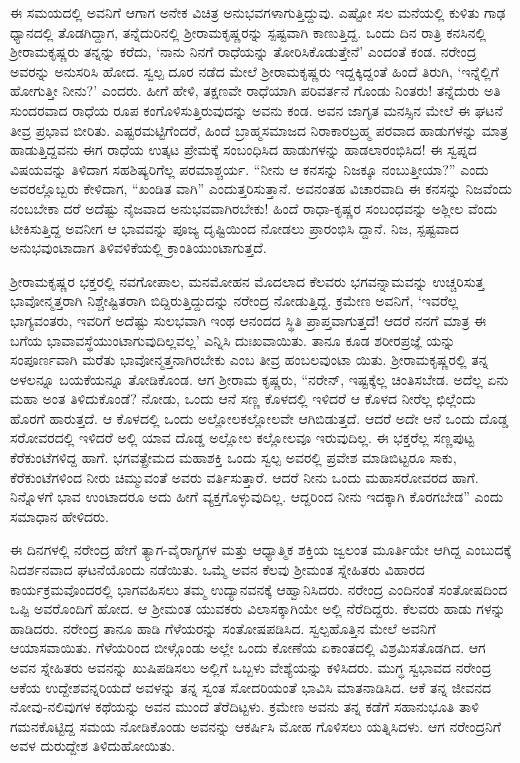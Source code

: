 ಈ ಸಮಯದಲ್ಲಿ ಅವನಿಗೆ ಆಗಾಗ ಅನೇಕ ವಿಚಿತ್ರ ಅನುಭವಗಳಾಗುತ್ತಿದ್ದುವು. ಎಷ್ಟೋ ಸಲ ಮನೆಯಲ್ಲಿ ಕುಳಿತು ಗಾಢ ಧ್ಯಾನದಲ್ಲಿ ತೊಡಗಿದ್ದಾಗ, ತನ್ನೆದುರಿನಲ್ಲಿ ಶ್ರೀರಾಮಕೃಷ್ಣರನ್ನು ಸ್ಪಷ್ಟವಾಗಿ ಕಾಣುತ್ತಿದ್ದ. ಒಂದು ದಿನ ರಾತ್ರಿ ಕನಸಿನಲ್ಲಿ ಶ್ರೀರಾಮಕೃಷ್ಣರು ತನ್ನನ್ನು ಕರೆದು, ‘ನಾನು ನಿನಗೆ ರಾಧೆಯನ್ನು ತೋರಿಸಿಕೊಡುತ್ತೇನೆ’ ಎಂದಂತೆ ಕಂಡ. ನರೇಂದ್ರ ಅವರನ್ನು ಅನುಸರಿಸಿ ಹೋದ. ಸ್ವಲ್ಪ ದೂರ ನಡೆದ ಮೇಲೆ ಶ್ರೀರಾಮಕೃಷ್ಣರು ಇದ್ದಕ್ಕಿದ್ದಂತೆ ಹಿಂದೆ ತಿರುಗಿ, ‘ಇನ್ನೆಲ್ಲಿಗೆ ಹೋಗುತ್ತೀ ನೀನು?’ ಎಂದರು. ಹೀಗೆ ಹೇಳಿ, ತಕ್ಷಣವೇ ರಾಧೆಯಾಗಿ ಪರಿವರ್ತನೆ ಗೊಂಡು ನಿಂತರು! ತನ್ನೆದುರು ಅತಿ ಸುಂದರವಾದ ರಾಧೆಯ ರೂಪ ಕಂಗೊಳಿಸುತ್ತಿರುವುದನ್ನು ಅವನು ಕಂಡ. ಅವನ ಜಾಗೃತ ಮನಸ್ಸಿನ ಮೇಲೆ ಈ ಘಟನೆ ತೀವ್ರ ಪ್ರಭಾವ ಬೀರಿತು. ಎಷ್ಟರಮಟ್ಟಿಗೆಂದರೆ, ಹಿಂದೆ ಬ್ರಾಹ್ಮಸಮಾಜದ ನಿರಾಕಾರಬ್ರಹ್ಮ ಪರವಾದ ಹಾಡುಗಳನ್ನು ಮಾತ್ರ ಹಾಡುತ್ತಿದ್ದವನು ಈಗ ರಾಧೆಯ ಉತ್ಕಟ ಪ್ರೇಮಕ್ಕೆ ಸಂಬಂಧಿಸಿದ ಹಾಡುಗಳನ್ನು ಹಾಡಲಾರಂಭಿಸಿದ! ಈ ಸ್ವಪ್ನದ ವಿಷಯವನ್ನು ತಿಳಿದಾಗ ಸಹಶಿಷ್ಯರಿಗೆಲ್ಲ ಪರಮಾಶ್ಚರ್ಯ. “ನೀನು ಆ ಕನಸನ್ನು ನಿಜಕ್ಕೂ ನಂಬುತ್ತೀಯಾ?” ಎಂದು ಅವರಲ್ಲೊಬ್ಬರು ಕೇಳಿದಾಗ, “ಖಂಡಿತ ವಾಗಿ” ಎಂದುತ್ತರಿಸುತ್ತಾನೆ. ಅವನಂತಹ ವಿಚಾರವಾದಿ ಈ ಕನಸನ್ನು ನಿಜವೆಂದು ನಂಬಬೇಕಾ ದರೆ ಅದೆಷ್ಟು ನೈಜವಾದ ಅನುಭವವಾಗಿರಬೇಕು! ಹಿಂದೆ ರಾಧಾ-ಕೃಷ್ಣರ ಸಂಬಂಧವನ್ನು ಅಶ್ಲೀಲ ವೆಂದು ಟೀಕಿಸುತ್ತಿದ್ದ ಅವನೀಗ ಆ ಭಾವವನ್ನು ಪೂಜ್ಯ ದೃಷ್ಟಿಯಿಂದ ನೋಡಲು ಪ್ರಾರಂಭಿಸಿ ದ್ದಾನೆ. ನಿಜ, ಸ್ಪಷ್ಟವಾದ ಅನುಭವುಂಟಾದಾಗ ತಿಳಿವಳಿಕೆಯಲ್ಲಿ ಕ್ರಾಂತಿಯುಂಟಾಗುತ್ತದೆ.

ಶ್ರೀರಾಮಕೃಷ್ಣರ ಭಕ್ತರಲ್ಲಿ ನವಗೋಪಾಲ, ಮನಮೋಹನ ಮೊದಲಾದ ಕೆಲವರು ಭಗವನ್ನಾಮವನ್ನು ಉಚ್ಚರಿಸುತ್ತ ಭಾವೋನ್ಮತ್ತರಾಗಿ ನಿಶ್ಚೇಷ್ಟಿತರಾಗಿ ಬಿದ್ದಿರುತ್ತಿದ್ದುದನ್ನು ನರೇಂದ್ರ ನೋಡುತ್ತಿದ್ದ. ಕ್ರಮೇಣ ಅವನಿಗೆ, ‘ಇವರೆಲ್ಲ ಭಾಗ್ಯವಂತರು, ಇವರಿಗೆ ಅದೆಷ್ಟು ಸುಲಭವಾಗಿ ಇಂಥ ಆನಂದದ ಸ್ಥಿತಿ ಪ್ರಾಪ್ತವಾಗುತ್ತದೆ! ಆದರೆ ನನಗೆ ಮಾತ್ರ ಈ ಬಗೆಯ ಭಾವಾವಸ್ಥೆಯುಂಟಾಗುವುದಿಲ್ಲವಲ್ಲ’ ಎನ್ನಿಸಿ ದುಃಖವಾಯಿತು. ತಾನೂ ಕೂಡ ಶರೀರಪ್ರಜ್ಞೆ ಯನ್ನು ಸಂಪೂರ್ಣವಾಗಿ ಮರೆತು ಭಾವೋನ್ಮತ್ತನಾಗಿರಬೇಕು ಎಂಬ ತೀವ್ರ ಹಂಬಲವುಂಟಾ ಯಿತು. ಶ್ರೀರಾಮಕೃಷ್ಣರಲ್ಲಿ ತನ್ನ ಅಳಲನ್ನೂ ಬಯಕೆಯನ್ನೂ ತೋಡಿಕೊಂಡ. ಆಗ ಶ್ರೀರಾಮ ಕೃಷ್ಣರು, “ನರೇನ್, ಇಷ್ಟಕ್ಕೆಲ್ಲ ಚಿಂತಿಸಬೇಡ. ಅದೆಲ್ಲ ಏನು ಮಹಾ ಅಂತ ತಿಳಿದುಕೊಂಡೆ? ನೋಡು, ಒಂದು ಆನೆ ಸಣ್ಣ ಕೊಳದಲ್ಲಿ ಇಳಿದರೆ ಆ ಕೊಳದ ನೀರೆಲ್ಲ ಛಿಲ್ಲೆಂದು ಹೊರಗೆ ಹಾರುತ್ತದೆ. ಆ ಕೊಳದಲ್ಲಿ ಒಂದು ಅಲ್ಲೋಲಕಲ್ಲೋಲವೇ ಆಗಿಬಿಡುತ್ತದೆ. ಆದರೆ ಅದೇ ಆನೆ ಒಂದು ದೊಡ್ಡ ಸರೋವರದಲ್ಲಿ ಇಳಿದರೆ ಅಲ್ಲಿ ಯಾವ ದೊಡ್ಡ ಅಲ್ಲೋಲ ಕಲ್ಲೋಲವೂ ಇರುವುದಿಲ್ಲ. ಈ ಭಕ್ತರೆಲ್ಲ ಸಣ್ಣಪುಟ್ಟ ಕೆರೆಕುಂಟೆಗಳಿದ್ದ ಹಾಗೆ. ಭಗವತ್ಪ್ರೇಮದ ಮಹಾಶಕ್ತಿ ಒಂದು ಸ್ವಲ್ಪ ಅವರಲ್ಲಿ ಪ್ರವೇಶ ಮಾಡಿಬಿಟ್ಟರೂ ಸಾಕು, ಕೆರೆಕುಂಟೆಗಳಿಂದ ನೀರು ಚಿಮ್ಮುವಂತೆ ಅವರು ವರ್ತಿಸುತ್ತಾರೆ. ಆದರೆ ನೀನು ಒಂದು ಮಹಾಸರೋವರದ ಹಾಗೆ. ನಿನ್ನೊಳಗೆ ಭಾವ ಉಂಟಾದರೂ ಅದು ಹೀಗೆ ವ್ಯಕ್ತಗೊಳ್ಳುವುದಿಲ್ಲ. ಆದ್ದರಿಂದ ನೀನು ಇದಕ್ಕಾಗಿ ಕೊರಗಬೇಡ” ಎಂದು ಸಮಾಧಾನ ಹೇಳಿದರು.

ಈ ದಿನಗಳಲ್ಲಿ ನರೇಂದ್ರ ಹೇಗೆ ತ್ಯಾಗ-ವೈರಾಗ್ಯಗಳ ಮತ್ತು ಆಧ್ಯಾತ್ಮಿಕ ಶಕ್ತಿಯ ಜ್ವಲಂತ ಮೂರ್ತಿಯೇ ಆಗಿದ್ದ ಎಂಬುದಕ್ಕೆ ನಿದರ್ಶನವಾದ ಘಟನೆಯೊಂದು ನಡೆಯಿತು. ಒಮ್ಮೆ ಅವನ ಕೆಲವು ಶ್ರೀಮಂತ ಸ್ನೇಹಿತರು ವಿಹಾರದ ಕಾರ್ಯಕ್ರಮವೊಂದರಲ್ಲಿ ಭಾಗವಹಿಸಲು ತಮ್ಮ ಉದ್ಯಾನವನಕ್ಕೆ ಆಹ್ವಾನಿಸಿದರು. ನರೇಂದ್ರ ಎಂದಿನಂತೆ ಸಂತೋಷದಿಂದ ಒಪ್ಪಿ ಅವರೊಂದಿಗೆ ಹೋದ. ಆ ಶ್ರೀಮಂತ ಯುವಕರು ವಿಲಾಸಕ್ಕಾಗಿಯೇ ಅಲ್ಲಿ ನೆರೆದಿದ್ದರು. ಕೆಲವರು ಹಾಡು ಗಳನ್ನು ಹಾಡಿದರು. ನರೇಂದ್ರ ತಾನೂ ಹಾಡಿ ಗೆಳೆಯರನ್ನು ಸಂತೋಷಪಡಿಸಿದ. ಸ್ವಲ್ಪಹೊತ್ತಿನ ಮೇಲೆ ಅವನಿಗೆ ಆಯಾಸವಾಯಿತು. ಗೆಳೆಯರಿಂದ ಬೀಳ್ಗೊಂಡು ಅಲ್ಲೇ ಒಂದು ಕೋಣೆಯ ಏಕಾಂತದಲ್ಲಿ ವಿಶ್ರಮಿಸತೊಡಗಿದ. ಆಗ ಅವನ ಸ್ನೇಹಿತರು ಅವನನ್ನು ಖುಷಿಪಡಿಸಲು ಅಲ್ಲಿಗೆ ಒಬ್ಬಳು ವೇಶ್ಯೆಯನ್ನು ಕಳಿಸಿದರು. ಮುಗ್ಧ ಸ್ವಭಾವದ ನರೇಂದ್ರ ಆಕೆಯ ಉದ್ದೇಶವನ್ನರಿಯದೆ ಅವಳನ್ನು ತನ್ನ ಸ್ವಂತ ಸೋದರಿಯಂತೆ ಭಾವಿಸಿ ಮಾತನಾಡಿಸಿದ. ಆಕೆ ತನ್ನ ಜೀವನದ ನೋವು-ನಲಿವುಗಳ ಕಥೆಯನ್ನು ಅವನ ಮುಂದೆ ತೆರೆದಿಟ್ಟಳು. ಕ್ರಮೇಣ ಅವನು ತನ್ನ ಕಡೆಗೆ ಸಹಾನುಭೂತಿ ತಾಳಿ ಗಮನಕೊಟ್ಟಿದ್ದ ಸಮಯ ನೋಡಿಕೊಂಡು ಅವನನ್ನು ಆಕರ್ಷಿಸಿ ಮೋಹ ಗೊಳಿಸಲು ಯತ್ನಿಸಿದಳು. ಆಗ ನರೇಂದ್ರನಿಗೆ ಅವಳ ದುರುದ್ದೇಶ ತಿಳಿದುಹೋಯಿತು.

